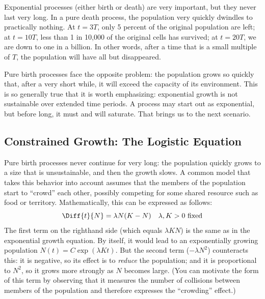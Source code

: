 Exponential processes (either birth or death) are very important, but
they never last very long. In a pure death process, the population
very quickly dwindles to practically nothing. At $t=3T$, only 5
percent of the original population are left; at $t=10T$, less than 1
in 10,000 of the original cells has survived; at $t=20T$, we are down
to one in a billion. In other words, after a time that is a small
multiple of $T$, the population will have all but disappeared.

Pure birth processes  face the opposite problem: the population grows
so quickly that, after a very short while, it will exceed the capacity
of its environment. This is so generally true that it is worth
emphasizing: exponential growth is not sustainable over extended 
time periods. A process may start out as exponential, but before long,
it must and will saturate. That brings us to the next scenario.


\subsection{Constrained Growth: The Logistic Equation}

  
Pure birth processes never continue for very long: the population
quickly grows to a size that is unsustainable, and then the growth
slows. A common model that takes this behavior into account assumes
that the members of the population start to ``crowd'' each other,
possibly competing for some shared resource such as food or territory.
Mathematically, this can be expressed as follows:
%
\[
\Diff{t}{N} = \lambda N (K-N) \quad \text{$\lambda, K > 0$ fixed}
\]
%
The first term on the righthand side (which equals $\lambda K N$) is
the same as in the exponential growth equation. By itself, it would
lead to an exponentially growing population $N(t) = C \exp( \lambda K
t )$. But the second term ($- \lambda N^2$) counteracts this: it is
negative, so its effect is to \emph{reduce} the population; and it is
proportional to $N^2$, so it grows more strongly as $N$ becomes large.
(You can motivate the form of this term by observing that it measures
the number of collisions between members of the population and
therefore expresses the ``crowding'' effect.)

